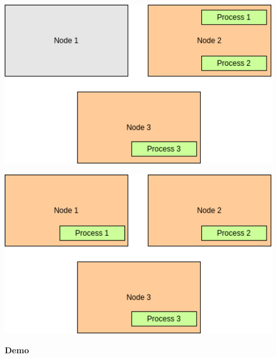 \documentclass{beamer}
\begin{document}
\begin{frame}
    \includegraphics[width=0.9\textwidth, height=0.9\textheight]{img/scenario_3.drawio.png}
\end{frame}


\begin{frame}
    \includegraphics[width=0.9\textwidth, height=0.9\textheight]{img/scenario_4.drawio.png}
\end{frame}


\begin{frame}
    \begin{center}
        \LARGE{\textbf{Demo}}
    \end{center}

\end{frame}
\end{document}
